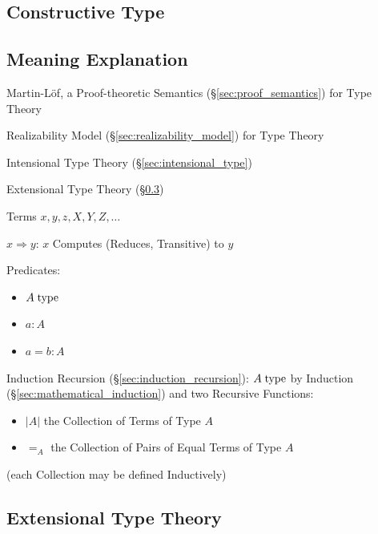 \subsection{Constructive Type}\label{sec:constructive_type}

\subsection{Meaning Explanation}\label{sec:meaning_explanation}

Martin-L\"of, a Proof-theoretic Semantics
(\S\ref{sec:proof_semantics}) for Type Theory

Realizability Model (\S\ref{sec:realizability_model}) for Type Theory

Intensional Type Theory (\S\ref{sec:intensional_type})

Extensional Type Theory (\S\ref{sec:extensional_type})

Terms $x,y,z,X,Y,Z,\ldots$

$x \Rightarrow y$: $x$ Computes (Reduces, Transitive) to $y$

Predicates:
\begin{itemize}
  \item $A \;\mathrm{type}$
  \item $a : A$
  \item $a = b : A$
\end{itemize}

Induction Recursion (\S\ref{sec:induction_recursion}): $A \;\mathrm{type}$ by
Induction (\S\ref{sec:mathematical_induction}) and two Recursive
Functions:
\begin{itemize}
  \item $|A|$ the Collection of Terms of Type $A$
  \item $=_A$ the Collection of Pairs of Equal Terms of Type $A$
\end{itemize}
(each Collection may be defined Inductively)



\subsection{Extensional Type Theory}\label{sec:extensional_type}
\cite{harper12}

